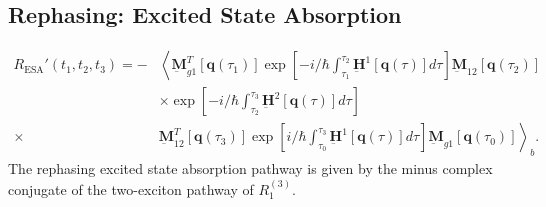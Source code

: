 \documentclass{article}
\newcommand{\bra}[1]{\ensuremath{\left\langle#1\right|}}
\newcommand{\ket}[1]{\ensuremath{\left|#1\right\rangle}}
\newcommand{\vect}[1]{\ensuremath{\boldsymbol{\mathbf{#1}}}}
\newcommand{\arw}{-{Latex[length=2mm]}}
\begin{document}
\subsection{Rephasing: Excited State Absorption}
\begin{figure}[h]
\centering
{}
\end{figure}
\begin{equation}
\begin{split}
 R_\mathrm{ESA}'(t_{1},t_{2},t_{3})=-
			  &\left\langle\underbar{\vect{M}}_{g1}^{T}[\vect q(\tau_{1})]\exp\left[-i/\hbar\int_{\tau_{1}}^{\tau_{2}}\underbar{\vect{H}}^{1}[\vect q(\tau)]d\tau\right] \underbar{\vect{M}}_{12} [\vect q(\tau_{2})]\right.\\
			  &\times\exp\left[-i/\hbar\int_{\tau_{2}}^{\tau_{3}}\underbar{\vect{H}}^{2}[\vect q(\tau)]d\tau\right]\\
			  \times&\left.\underbar{\vect{M}}_{12}^{T}[\vect q(\tau_{3})]\exp\left[i/\hbar\int_{\tau_{0}}^{\tau_{3}}\underbar{\vect{H}}^{1}[\vect q(\tau)]d\tau\right] \underbar{\vect{M}}_{g1} [\vect q(\tau_{0})]\right\rangle_{b}.
\end{split}
\end{equation}
The rephasing excited state absorption pathway is given by the minus complex conjugate of the two-exciton pathway of $R_{1}^{(3)}$.\cite{Hamm2011}

\clearpage
\end{document}
